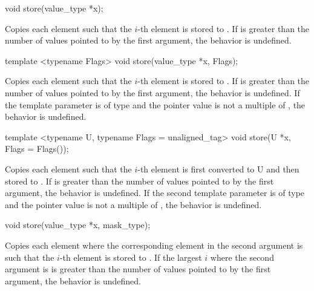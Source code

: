 \begin{wgText}
  \begin{itemdecl}
void store(value_type *x);
  \end{itemdecl}
  \begin{itemdescr}
    \pnum\effects Copies each element such that the $i$-th element is stored to .
    \pnum\remarks If \datapar{} is greater than the number of values pointed to by the first argument, the behavior is undefined.
  \end{itemdescr}

  \begin{itemdecl}
template <typename Flags> void store(value_type *x, Flags);
  \end{itemdecl}
  \begin{itemdescr}
    \pnum\effects Copies each element such that the $i$-th element is stored to .
    \pnum\remarks If \datapar{} is greater than the number of values pointed to by the first argument, the behavior is undefined.
    \pnum         If the template parameter is of type  and the pointer value is not a multiple of , the behavior is undefined.
  \end{itemdescr}

  \begin{itemdecl}
template <typename U, typename Flags = unaligned_tag> void store(U *x, Flags = Flags());
  \end{itemdecl}
  \begin{itemdescr}
    \pnum\effects Copies each element such that the $i$-th element is first converted to \type U and then stored to .
    \pnum\remarks If \datapar{} is greater than the number of values pointed to by the first argument, the behavior is undefined.
    \pnum         If the second template parameter is of type  and the pointer value is not a multiple of , the behavior is undefined.
  \end{itemdescr}

  \begin{itemdecl}
void store(value_type *x, mask_type);
  \end{itemdecl}
  \begin{itemdescr}
    \pnum\effects Copies each element where the corresponding element in the second argument is \true such that the $i$-th element is stored to .
    \pnum\remarks If the largest $i$ where the second argument is \true is greater than the number of values pointed to by the first argument, the behavior is undefined.
  \end{itemdescr}


\end{wgText}
